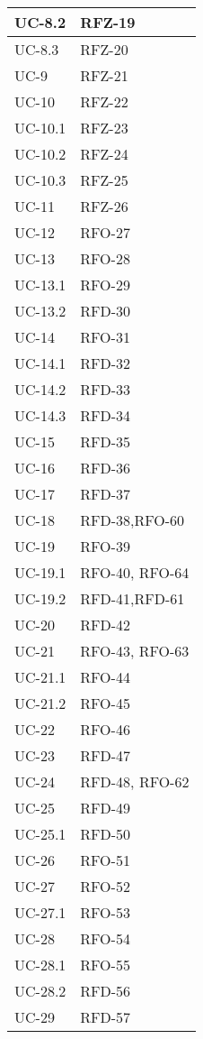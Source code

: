 \begin{xltabular}{\textwidth}{|x| X |}
    \hline
    UC-8.2 & RFZ-19\\
    \hline
    UC-8.3 & RFZ-20\\
    \hline
    UC-9 & RFZ-21\\
    \hline
    UC-10 & RFZ-22\\
    \hline
    UC-10.1 & RFZ-23 \\
    \hline
    UC-10.2 & RFZ-24 \\
    \hline
    UC-10.3 & RFZ-25 \\
    \hline
    UC-11 & RFZ-26 \\
    \hline
    UC-12 & RFO-27\\
    \hline
    UC-13 & RFO-28\\
    \hline
    UC-13.1 & RFO-29 \\
    \hline
    UC-13.2 & RFD-30\\
    \hline
    UC-14 & RFO-31 \\
    \hline
    UC-14.1 & RFD-32  \\
    \hline
    UC-14.2 & RFD-33\\
    \hline
    UC-14.3 & RFD-34\\
    \hline
    UC-15 & RFD-35 \\
    \hline
    UC-16 & RFD-36\\
    \hline
    UC-17 & RFD-37 \\
    \hline
    UC-18 & RFD-38,\newline RFO-60  \\
    \hline
    UC-19 & RFO-39 \\
    \hline
    UC-19.1 & RFO-40, \newline RFO-64 \\
    \hline
    UC-19.2 & RFD-41,\newline RFD-61 \\
    \hline
    UC-20 & RFD-42 \\
    \hline
    UC-21 & RFO-43, \newline RFO-63 \\
    \hline
    UC-21.1 & RFO-44 \\
    \hline
    UC-21.2 & RFO-45 \\
    \hline
    UC-22 & RFO-46  \\
    \hline
    UC-23 & RFD-47 \\
    \hline
    UC-24 & RFD-48, \newline RFO-62 \\
    \hline
    UC-25 & RFD-49  \\
    \hline
    UC-25.1 & RFD-50  \\
    \hline
    UC-26 & RFO-51 \\
    \hline
    UC-27 & RFO-52  \\
    \hline
    UC-27.1 & RFO-53 \\
    \hline
    UC-28 & RFO-54  \\
    \hline
    UC-28.1 & RFO-55 \\
    \hline
    UC-28.2 & RFD-56 \\
    \hline
    UC-29 & RFD-57 \\
    

\end{xltabular}
